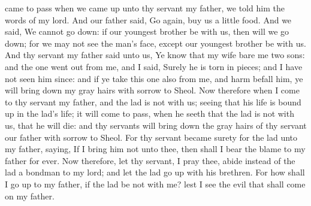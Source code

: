 came to pass when we came up unto thy servant my father, we told him the words of my lord. And our father said, Go again, buy us a little food. And we said, We cannot go down: if our youngest brother be with us, then will we go down; for we may not see the man’s face, except our youngest brother be with us. And thy servant my father said unto us, Ye know that my wife bare me two sons: and the one went out from me, and I said, Surely he is torn in pieces; and I have not seen him since: and if ye take this one also from me, and harm befall him, ye will bring down my gray hairs with sorrow to Sheol. Now therefore when I come to thy servant my father, and the lad is not with us; seeing that his life is bound up in the lad’s life; it will come to pass, when he seeth that the lad is not with us, that he will die: and thy servants will bring down the gray hairs of thy servant our father with sorrow to Sheol. For thy servant became surety for the lad unto my father, saying, If I bring him not unto thee, then shall I bear the blame to my father for ever. Now therefore, let thy servant, I pray thee, abide instead of the lad a bondman to my lord; and let the lad go up with his brethren. For how shall I go up to my father, if the lad be not with me? lest I see the evil that shall come on my father. 


